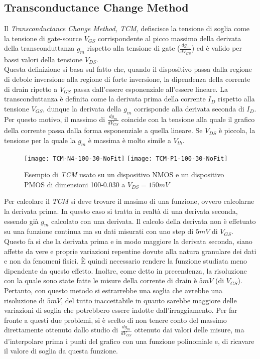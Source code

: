 \subsection{Transconductance Change Method}
Il \emph{Transconductance Change Method, TCM,} defiscisce la tensione di soglia come la tensione di gate-source $V_{GS}$ corrispondente al picco massimo della derivata della transconduttanza $g_m$ rispetto alla tensione di gate ($\frac{dg_m}{dV_ {GS}}$) ed è valido per bassi valori della tensione $V_{DS}$.\\
Questa definizione si basa sul fatto che, quando il dispositivo passa dalla regione di debole inversione alla regione di forte inversione, la dipendenza della corrente di drain ripetto a $V_{GS}$ passa dall'essere esponenziale all'essere lineare.
La transconduttanza è definita come la derivata prima della corrente $I_D$ rispetto alla tensione $V_{GS}$, dunque la derivata della $g_m$ corrisponde alla derivata seconda di $I_D$. Per questo motivo, il massimo di $\frac{dg_m}{dV_{GS}}$ coincide con la tensione alla quale il grafico della corrente passa dalla forma esponenziale a quella lineare. Se $V_{DS}$ è piccola, la tensione per la quale la $g_m$ è massima è molto simile a $V_{th}$.

\begin{figure}[h!]
  \centering
  \texttt{[image: TCM-N4-100-30-NoFit]}
  \texttt{[image: TCM-P1-100-30-NoFit]}
  \caption{Esempio di \emph{TCM} usato su un dispositivo NMOS e un dispositivo PMOS di dimensioni 100-0.030 a $V_{DS} = 150 mV$}
\end{figure}

Per calcolare il \emph{TCM} si deve trovare il masimo di una funzione, ovvero calcolarne la derivata prima. In questo caso si tratta in realtà di una derivata seconda, essendo già $g_m$ calcolato con una derivata. Il calcolo della derivata non è effetuato su una funzione continua ma su dati misurati con uno step di $5mV$ di $V_{GS}$. Questo fa si che la derivata prima e in modo maggiore la derivata seconda, siano affette da vere e proprie variazioni repentine dovute alla natura granulare dei dati e non da fenomeni fisici. È quindi necessario rendere la funzione studiata meno dipendente da questo effetto. Inoltre, come detto in precendenza, la risoluzione con la quale sono state fatte le misure della corrente di drain è $5mV$ (di $V_{GS}$). Pertanto, con questo metodo si estrarrebbe una soglia che avrebbe una risoluzione di $5mV$, del tutto inaccettabile in quanto sarebbe maggiore delle variazioni di soglia che potrebbero essere indotte dall'irraggiamento.
Per far fronte a questi due problemi, si è scelto di non tenere conto del massimo direttamente ottenuto dallo studio di $\frac{dg_m}{dV_{GS}}$ ottenuto dai valori delle misure, ma d'interpolare prima i punti del grafico con una funzione polinomiale e, di ricavare il valore di soglia da questa funzione.

